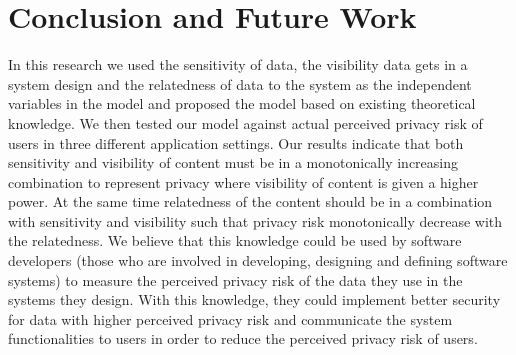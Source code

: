 \documentclass[10pt]{article}
\newcommand{\sansserifformat}[1]{\fontfamily{cmss}{ #1}}%
\begin{document}
\section{Conclusion and Future Work}
In this research we used the sensitivity of data, the visibility data gets in a system design and the relatedness of data to the system as the independent variables in the model and proposed the model based on existing theoretical knowledge. We then tested our model against actual perceived privacy risk of users in three different application settings. Our results indicate that both sensitivity and visibility of content must be in a monotonically increasing combination to represent privacy where visibility of content is given a higher power. At the same time relatedness of the content should be in a combination with sensitivity and visibility such that privacy risk monotonically decrease with the relatedness. We believe that this knowledge could be used by software developers (those who are involved in developing, designing and defining software systems) to measure the perceived privacy risk of the data they use in the systems they design. With this knowledge, they could implement better security for data with higher perceived privacy risk and communicate the system functionalities to users in order to reduce the perceived privacy risk of users. 









\end{document}
